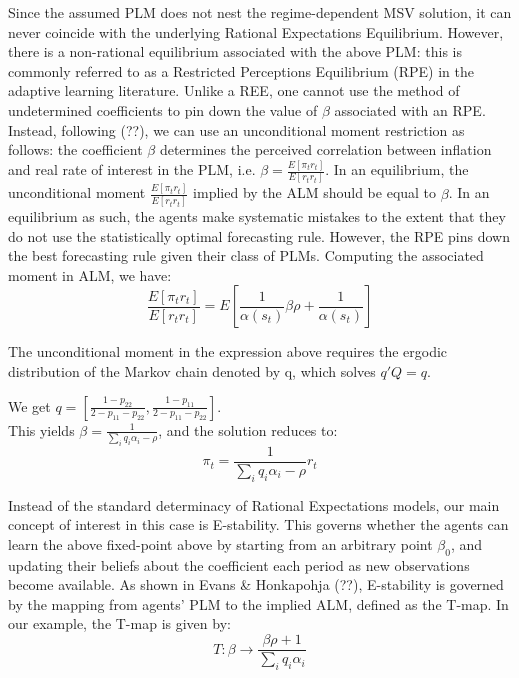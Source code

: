 \documentclass[12pt,reqno]{article}
\numberwithin{equation}{section}
\begin{document}
Since the assumed PLM does not nest the regime-dependent MSV solution, it can never coincide with the underlying Rational Expectations Equilibrium. However, there is a non-rational equilibrium associated with the above PLM: this is commonly referred to as a Restricted Perceptions Equilibrium (RPE) in the adaptive learning literature. Unlike a REE, one cannot use the method of undetermined coefficients to pin down the value of $\beta$ associated with an RPE. Instead, following (??), we can use an unconditional moment restriction as follows: the coefficient $\beta$ determines the {perceived correlation} between inflation and real rate of interest in the PLM, i.e.   $\beta=\frac{E [\pi_t r_t]}{E[r_t r_t]} $. In an equilibrium, the unconditional moment $\frac{E [\pi_t r_t]}{E[r_t r_t]} $ implied by the ALM should be equal to $\beta$. In an equilibrium as such, the agents make systematic mistakes to the extent that they do not use the statistically optimal forecasting rule. However, the RPE pins down the best forecasting rule given their class of PLMs. Computing the associated moment in ALM, we have: \\

$$\frac{ E[\pi_t r_t]}{E[r_t r_t]} = E[ \frac{1}{\alpha(s_t)} \beta \rho + \frac{1}{\alpha(s_t)}]$$

The unconditional moment in the expression above requires the ergodic distribution of the Markov chain denoted by q, which solves $ q' Q = q $.

We get $ q= [ \frac{1-p_{22}}{2-p_{11}- p_{22}}, \frac{1-p_{11}}{2-p_{11}-p_{22}}] $. \\

This yields $ \beta = \frac{1}{\sum_i q_i \alpha_i  -\rho } $, and the solution reduces to: \\

$$ \pi_t = \frac{1}{\sum_i q_i \alpha_i  -\rho} r_t $$

Instead of the standard determinacy of Rational Expectations models, our main concept of interest in this case is E-stability. This governs whether the agents can learn the above fixed-point above by starting from an arbitrary point $\beta_0$, and updating their beliefs about the coefficient each period as new observations become available. As shown in Evans \& Honkapohja (??), E-stability is governed by the mapping from agents' PLM to the implied ALM, defined as the T-map. In our example, the T-map is given by: \\

$$ T: \beta \rightarrow \frac{\beta \rho + 1 }{\sum_i q_i \alpha_i} $$
\end{document}
